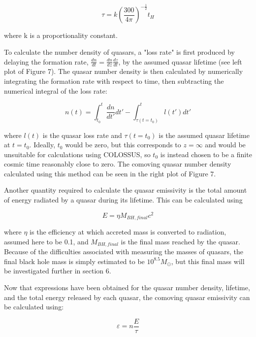 \documentclass[12pt, twocolumn]{article}%
\begin{document}
\begin{equation}
    \tau=k\left(\frac{300}{4\pi}\right)^{-\frac{1}{2}}t_H
\end{equation}

\noindent where k is a proportionality constant.\par

To calculate the number density of quasars, a "loss rate" is first produced by delaying the formation rate, $\frac{dn}{dt}=\frac{dn}{dz}\frac{dz}{dt}$, by the assumed quasar lifetime (see left plot of Figure 7). The quasar number density is then calculated by numerically integrating the formation rate with respect to time, then subtracting the numerical integral of the loss rate:

\begin{equation}
    n(t)=\int_{t_0}^t\frac{dn}{dt'}dt'-\int_{\tau(t=t_0)}^tl(t')dt'
\end{equation}

\noindent where $l(t)$ is the quasar loss rate and $\tau(t=t_0)$ is the assumed quasar lifetime at $t=t_0$. Ideally, $t_0$ would be zero, but this corresponds to $z=\infty$ and would be unsuitable for calculations using COLOSSUS, so $t_0$ is instead chosen to be a finite cosmic time reasonably close to zero. The comoving quasar number density calculated using this method can be seen in the right plot of Figure 7.\par

Another quantity required to calculate the quasar emissivity is the total amount of energy radiated by a quasar during its lifetime. This can be calculated using

\begin{equation}
    E=\eta M_{BH,final}c^2
\end{equation}

\noindent where $\eta$ is the efficiency at which accreted mass is converted to radiation, assumed here to be 0.1, and $M_{BH,final}$ is the final mass reached by the quasar. Because of the difficulties associated with measuring the masses of quasars, the final black hole mass is simply estimated to be $10^{8.5}M_\odot$, but this final mass will be investigated further in section 6.\par

Now that expressions have been obtained for the quasar number density, lifetime, and the total energy released by each quasar, the comoving quasar emissivity can be calculated using:

\begin{equation}
    \varepsilon=n\frac{E}{\tau}
\end{equation}
\end{document}
